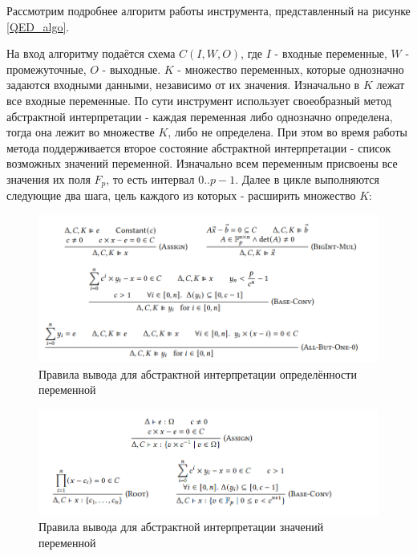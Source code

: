 \documentclass[a4paper]{article}
\begin{document}
Рассмотрим подробнее алгоритм работы инструмента, представленный на рисунке \ref{QED_algo}.

На вход алгоритму подаётся схема $C(I,W,O)$, где $I$ - входные переменные, $W$ - промежуточные, $O$ - выходные. $K$ - множество переменных, которые однозначно задаются входными данными, независимо от их значения. Изначально в $K$ лежат все входные переменные. По сути инструмент использует своеобразный метод абстрактной интерпретации - каждая переменная либо однозначно определена, тогда она лежит во множестве $K$, либо не определена. При этом во время работы метода поддерживается второе состояние абстрактной интерпретации - список возможных значений переменной. Изначально всем переменным присвоены все значения их поля $F_p$, то есть интервал $0..p-1$. Далее в цикле выполняются следующие два шага, цель каждого из которых - расширить множество $K$:

\begin{figure}[ht!]
    \includegraphics[width=180mm]{QED_rules.png}
    \caption{Правила вывода для абстрактной интерпретации определённости переменной}
    \label{QED_rules}
\end{figure}

\begin{figure}[ht!]
    \includegraphics[width=180mm]{QED_values.png}
    \caption{Правила вывода для абстрактной интерпретации значений переменной}
    \label{QED_values}
\end{figure}
\end{document}
